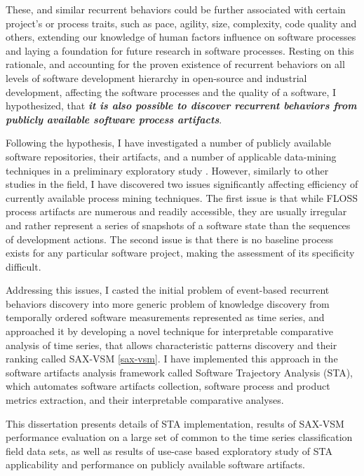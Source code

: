 These, and similar recurrent behaviors could be further associated with certain project's or process 
traits, such as pace, agility, size, complexity, code quality and others, extending our knowledge of human 
factors influence on software processes and laying a foundation for future research in software processes.
Resting on this rationale, and accounting for the proven existence of recurrent behaviors 
on all levels of software development hierarchy \cite{citeulike:8347315} in open-source \cite{citeulike:200721}
and industrial \cite{citeulike:5090131} development, affecting the software processes and the quality 
of a software, I hypothesized, that \textbf{\textit{it is also possible to discover recurrent behaviors 
from publicly available software process artifacts}}. 

Following the hypothesis, I have investigated a number of publicly available software repositories,
their artifacts, and a number of applicable data-mining techniques in a preliminary exploratory study 
\cite{csdl2-10-09}. However, similarly to other studies in the field, I have discovered two issues 
significantly affecting efficiency of currently available process mining techniques. 
The first issue is that while FLOSS process artifacts are numerous and readily accessible, 
they are usually irregular and rather represent a series of snapshots of a software state 
than the sequences of development actions. 
The second issue is that there is no baseline process exists for any particular software project,
making the assessment of its specificity difficult.

Addressing this issues, I casted the initial problem of event-based recurrent behaviors 
discovery into more generic problem of knowledge discovery from temporally ordered software measurements 
represented as time series, and approached it by developing a novel technique for interpretable 
comparative analysis of time series, that allows characteristic patterns discovery and their ranking 
called SAX-VSM \ref{sax-vsm}. I have implemented this approach in the software artifacts analysis framework 
called Software Trajectory Analysis (STA), which automates software artifacts collection, software process and 
product metrics extraction, and their interpretable comparative analyses. 

This dissertation presents details of STA implementation, results of SAX-VSM performance evaluation on a large 
set of common to the time series classification field data sets, as well as results of use-case based exploratory 
study of STA applicability and performance on publicly available software artifacts.

